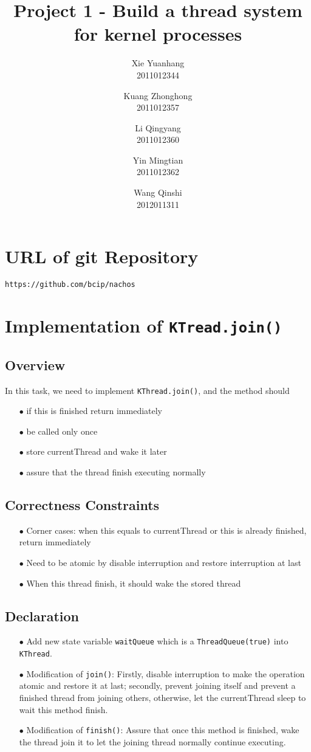 \documentclass{article}
\title{Project 1 - Build a thread system for kernel processes}
\author{Xie Yuanhang\\ 2011012344\and
Kuang Zhonghong\\ 2011012357\and
Li Qingyang\\ 2011012360\and
Yin Mingtian\\ 2011012362\and
Wang Qinshi\\ 2012011311}
\date{}
\begin{document}
\maketitle
\tableofcontents{}
\section{URL of git Repository}
\texttt{https://github.com/bcip/nachos}
 \section{Implementation of \texttt{KTread.join()}}
\subsection{Overview}
In this task, we need to implement \texttt{KThread.join()}, and the method should 
\begin{enumerate}
	\item[$\bullet$] if this is finished return immediately
	\item[$\bullet$] be called only once
	\item[$\bullet$] store currentThread and wake it later
	\item[$\bullet$] assure that the thread finish executing normally
\end{enumerate}
\subsection{Correctness Constraints}
\begin{enumerate}
	\item[$\bullet$] Corner cases: when this equals to currentThread or this is already finished, return immediately
	\item[$\bullet$] Need to be atomic by disable interruption and restore interruption at last
	\item[$\bullet$] When this thread finish, it should wake the stored thread
\end{enumerate}
\subsection{Declaration}
\begin{enumerate}
	\item[$\bullet$] Add new state variable \texttt{waitQueue} which is a \texttt{ThreadQueue(true)} into \texttt{KThread}.
	\item[$\bullet$] Modification of \texttt{join()}:
		Firstly, disable interruption to make the operation atomic and restore it at last; 
		secondly, prevent joining itself and prevent a finished thread from joining others, otherwise, let the currentThread sleep to wait this method finish.
	\item[$\bullet$] Modification of \texttt{finish()}:
		Assure that once this method is finished, wake the thread join it to let the joining thread normally continue executing.
\end{enumerate}
\end{document}
